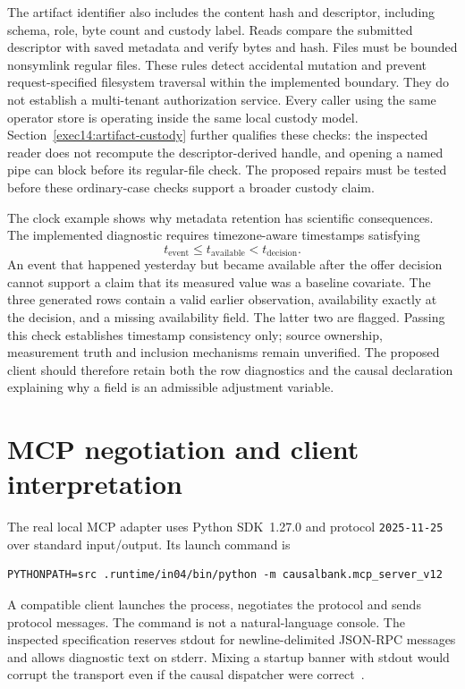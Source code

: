 The artifact identifier also includes the content hash and descriptor,
including schema, role, byte count and custody label. Reads compare the
submitted descriptor with saved metadata and verify bytes and hash. Files
must be bounded nonsymlink regular files. These rules detect accidental
mutation and prevent request-specified filesystem traversal within the
implemented boundary. They do not establish a multi-tenant authorization
service. Every caller using the same operator store is operating inside
the same local custody model. Section~\ref{exec14:artifact-custody} further qualifies these checks: the inspected reader does not recompute the descriptor-derived handle, and opening a named pipe can block before its regular-file check. The proposed repairs must be tested before these ordinary-case checks support a broader custody claim.

The clock example shows why metadata retention has scientific consequences.
The implemented diagnostic requires timezone-aware timestamps satisfying
\[
 t_{\mathrm{event}}\leq t_{\mathrm{available}}<t_{\mathrm{decision}}.
\]
An event that happened yesterday but became available after the offer decision
cannot support a claim that its measured value was a baseline covariate.
The three generated rows contain a valid earlier observation, availability
exactly at the decision, and a missing availability field. The latter two
are flagged. Passing this check establishes timestamp consistency only;
source ownership, measurement truth and inclusion mechanisms remain unverified.
The proposed client should therefore retain both the row diagnostics and the
causal declaration explaining why a field is an admissible adjustment variable.

\section{MCP negotiation and client interpretation}

The real local MCP adapter uses Python SDK~1.27.0 and protocol
\texttt{2025-11-25} over standard input/output. Its launch command is
\begin{lstlisting}
PYTHONPATH=src .runtime/in04/bin/python -m causalbank.mcp_server_v12
\end{lstlisting}
A compatible client launches the process, negotiates the protocol and sends
protocol messages. The command is not a natural-language console. The
inspected specification reserves stdout for newline-delimited JSON-RPC
messages and allows diagnostic text on stderr. Mixing a startup banner with
stdout would corrupt the transport even if the causal dispatcher were
correct~\citep{v12_mcp_legacy_stdio}.

